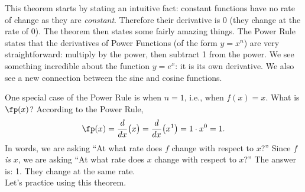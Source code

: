 This theorem starts by stating an intuitive fact: constant functions have no rate of change as they are \textit{constant}. Therefore their derivative is 0 (they change at the rate of 0). The theorem then states some fairly amazing things. The Power Rule states that the derivatives of Power Functions (of the form $y=x^n$) are very straightforward: multiply by the power, then subtract 1 from the power. We see something incredible about the function $y=e^x$: it is its own derivative. We also see a new connection between the sine and cosine functions. 

One special case of the Power Rule is when $n=1$, i.e., when $f(x) = x$. What is $\fp(x)$? According to the Power Rule, $$\fp(x) = \frac{d}{dx}\big(x\big) = \frac{d}{dx}\big(x^1\big) = 1\cdot x^0 = 1.$$ In words, we are asking ``At what rate does $f$ change with respect to $x$?'' Since $f$ \textit{is} $x$, we are asking ``At what rate does $x$ change with respect to $x$?'' The answer is: 1. They change at the same rate.\\

\enlargethispage{1\baselineskip}
Let's practice using this theorem.\\

